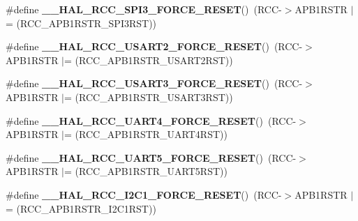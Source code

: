 \begin{DoxyCompactItemize}
\#define {\bfseries \+\_\+\+\_\+\+H\+A\+L\+\_\+\+R\+C\+C\+\_\+\+S\+P\+I3\+\_\+\+F\+O\+R\+C\+E\+\_\+\+R\+E\+S\+ET}()~(R\+CC-\/$>$A\+P\+B1\+R\+S\+TR $\vert$= (R\+C\+C\+\_\+\+A\+P\+B1\+R\+S\+T\+R\+\_\+\+S\+P\+I3\+R\+ST))
\item 
\mbox{\label{group___r_c_c_ex___force___release___peripheral___reset_gab4de80173ffa0e599baab0e76d562cc3}} 
\#define {\bfseries \+\_\+\+\_\+\+H\+A\+L\+\_\+\+R\+C\+C\+\_\+\+U\+S\+A\+R\+T2\+\_\+\+F\+O\+R\+C\+E\+\_\+\+R\+E\+S\+ET}()~(R\+CC-\/$>$A\+P\+B1\+R\+S\+TR $\vert$= (R\+C\+C\+\_\+\+A\+P\+B1\+R\+S\+T\+R\+\_\+\+U\+S\+A\+R\+T2\+R\+ST))
\item 
\mbox{\label{group___r_c_c_ex___force___release___peripheral___reset_ga8902e16d49b4335d213b6a115c19127b}} 
\#define {\bfseries \+\_\+\+\_\+\+H\+A\+L\+\_\+\+R\+C\+C\+\_\+\+U\+S\+A\+R\+T3\+\_\+\+F\+O\+R\+C\+E\+\_\+\+R\+E\+S\+ET}()~(R\+CC-\/$>$A\+P\+B1\+R\+S\+TR $\vert$= (R\+C\+C\+\_\+\+A\+P\+B1\+R\+S\+T\+R\+\_\+\+U\+S\+A\+R\+T3\+R\+ST))
\item 
\mbox{\label{group___r_c_c_ex___force___release___peripheral___reset_ga462f7bbb84307a5841556d43d7932d83}} 
\#define {\bfseries \+\_\+\+\_\+\+H\+A\+L\+\_\+\+R\+C\+C\+\_\+\+U\+A\+R\+T4\+\_\+\+F\+O\+R\+C\+E\+\_\+\+R\+E\+S\+ET}()~(R\+CC-\/$>$A\+P\+B1\+R\+S\+TR $\vert$= (R\+C\+C\+\_\+\+A\+P\+B1\+R\+S\+T\+R\+\_\+\+U\+A\+R\+T4\+R\+ST))
\item 
\mbox{\label{group___r_c_c_ex___force___release___peripheral___reset_ga326264be9dae134e1bdccdd0161b23d1}} 
\#define {\bfseries \+\_\+\+\_\+\+H\+A\+L\+\_\+\+R\+C\+C\+\_\+\+U\+A\+R\+T5\+\_\+\+F\+O\+R\+C\+E\+\_\+\+R\+E\+S\+ET}()~(R\+CC-\/$>$A\+P\+B1\+R\+S\+TR $\vert$= (R\+C\+C\+\_\+\+A\+P\+B1\+R\+S\+T\+R\+\_\+\+U\+A\+R\+T5\+R\+ST))
\item 
\mbox{\label{group___r_c_c_ex___force___release___peripheral___reset_ga551c171f88af86ca985db634ac9e3275}} 
\#define {\bfseries \+\_\+\+\_\+\+H\+A\+L\+\_\+\+R\+C\+C\+\_\+\+I2\+C1\+\_\+\+F\+O\+R\+C\+E\+\_\+\+R\+E\+S\+ET}()~(R\+CC-\/$>$A\+P\+B1\+R\+S\+TR $\vert$= (R\+C\+C\+\_\+\+A\+P\+B1\+R\+S\+T\+R\+\_\+\+I2\+C1\+R\+ST))

\end{DoxyCompactItemize}
